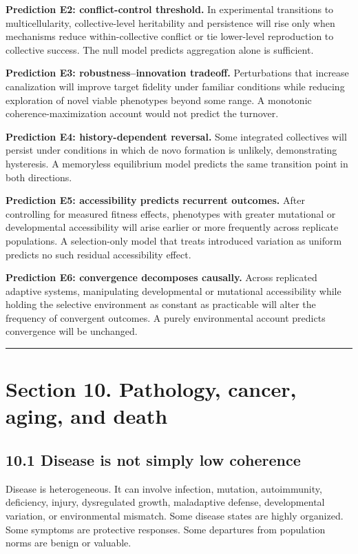 \documentclass[
  11pt,
]{article}
\begin{document}
\textbf{Prediction E2: conflict-control threshold.} In experimental
transitions to multicellularity, collective-level heritability and
persistence will rise only when mechanisms reduce within-collective
conflict or tie lower-level reproduction to collective success. The null
model predicts aggregation alone is sufficient.

\textbf{Prediction E3: robustness--innovation tradeoff.} Perturbations
that increase canalization will improve target fidelity under familiar
conditions while reducing exploration of novel viable phenotypes beyond
some range. A monotonic coherence-maximization account would not predict
the turnover.

\textbf{Prediction E4: history-dependent reversal.} Some integrated
collectives will persist under conditions in which de novo formation is
unlikely, demonstrating hysteresis. A memoryless equilibrium model
predicts the same transition point in both directions.

\textbf{Prediction E5: accessibility predicts recurrent outcomes.} After
controlling for measured fitness effects, phenotypes with greater
mutational or developmental accessibility will arise earlier or more
frequently across replicate populations. A selection-only model that
treats introduced variation as uniform predicts no such residual
accessibility effect.

\textbf{Prediction E6: convergence decomposes causally.} Across
replicated adaptive systems, manipulating developmental or mutational
accessibility while holding the selective environment as constant as
practicable will alter the frequency of convergent outcomes. A purely
environmental account predicts convergence will be unchanged.

\begin{center}\rule{0.5\linewidth}{0.5pt}\end{center}

\section{Section 10. Pathology, cancer, aging, and
death}\label{section-10.-pathology-cancer-aging-and-death}

\subsection{10.1 Disease is not simply low
coherence}\label{disease-is-not-simply-low-coherence}

Disease is heterogeneous. It can involve infection, mutation,
autoimmunity, deficiency, injury, dysregulated growth, maladaptive
defense, developmental variation, or environmental mismatch. Some
disease states are highly organized. Some symptoms are protective
responses. Some departures from population norms are benign or valuable.
\end{document}
